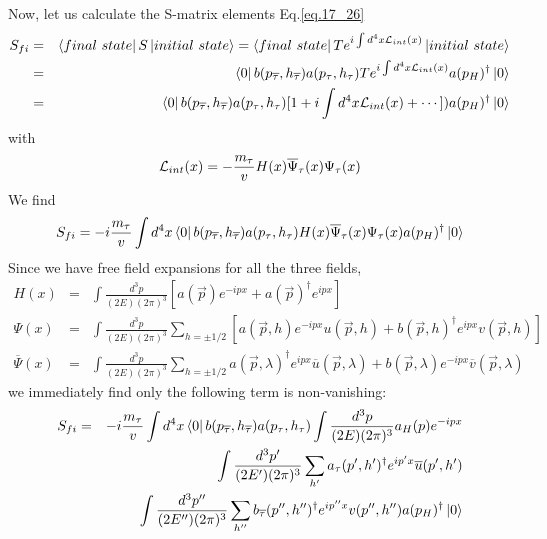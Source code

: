 \documentclass[12pt]{article}
\def\dgr{\dagger}
\begin{document}
  Now, let us calculate the S-matrix elements Eq.\ref{eq.17_26}
\begin{eqnarray}
  S_{fi}
  &=& \bra{final~state} S \ket{initial~state}
  = \bra{final~state} T e^{ i\int d^4x {\cal L}_{int}(x) } \ket{initial~state} \\
  &=& \bra{0} b(p_{\overline \tau},h_{\overline \tau}) a(p_\tau,h_\tau) T e^{ i\int d^4x {\cal L}_{int}(x) } a(p_H)^\dgr \ket{0} \\
  &=& \bra{0} b(p_{\overline \tau},h_{\overline \tau}) a(p_\tau,h_\tau)  [1 + i\int d^4x {\cal L}_{int}(x) +\cdots] )a(p_H)^\dgr \ket{0} \label{eq.17_36}
\end{eqnarray}
  with
\begin{eqnarray}
  {\cal L}_{int} (x) = -\frac{m_\tau}{v} H(x) {\overline \Psi}_\tau(x) \Psi_\tau(x) \label{eq.17_37}
\end{eqnarray}
  We find
\begin{eqnarray}
  S_{fi}= -i\frac{m_\tau}{v} \int d^4 x
  \bra{0} b(p_{\overline \tau},h_{\overline \tau}) a(p_\tau,h_\tau)
      H(x) {\overline \Psi}_\tau(x) \Psi_\tau(x) a(p_H)^\dgr \ket{0} \label{eq.17_38}
\end{eqnarray}
  Since we have free field expansions for all the three fields,
\begin{eqnarray}
  H(x)  &=& \int \frac{d^3p}{(2E)(2\pi)^3} [ a({\vec p}) e^{-ipx} + a(\vec p)^\dgr e^{ipx} ] \label{eq.17_39a} \\
\Psi(x)  &=& \int \frac{d^3p}{(2E)(2\pi)^3}
  \sum_{h=\pm1/2} [a({\vec p},h)     e^{-ipx} u({\vec p},h)
  + b({\vec p},h)^\dgr e^{ipx}  v({\vec p},h)]  \label{eq.17_39b} \\ 
{\overline \Psi}(x) &=& \int \frac{d^3p}{(2E)(2\pi)^3} \sum_{h=\pm1/2}
  { a({\vec p},\lambda)^\dgr e^{ipx}  {\overline u}({\vec p},\lambda)
  + b({\vec p},\lambda)      e^{-ipx} {\overline v}({\vec p},\lambda) } \label{eq.17_39c}
\end{eqnarray}
we immediately find only the following term is non-vanishing:
\begin{eqnarray}
  S_{fi} &=& -i\frac{m_\tau}{v} \int d^4 x
  \bra{0} b(p_{\overline \tau},h_{\overline \tau}) a(p_\tau,h_\tau)
  \int \frac{d^3p}{(2E)(2\pi)^3} a_H(p) e^{-ipx}
  \nonumber \\&&\int \frac{d^3p'}{(2E')(2\pi)^3} \sum_{h'}
      a_\tau(p',h')^\dgr e^{ip'x}  {\overline u}(p',h')
      \nonumber \\&& \int \frac{d^3p{''}}{(2E{''})(2\pi)^3} \sum_{h{''}}
      b_{\overline \tau}(p{''},h{''})^\dgr e^{ip{''}x} v(p{''},h{''})
  a(p_H)^\dgr \ket{0} 
\end{eqnarray}
\end{document}

